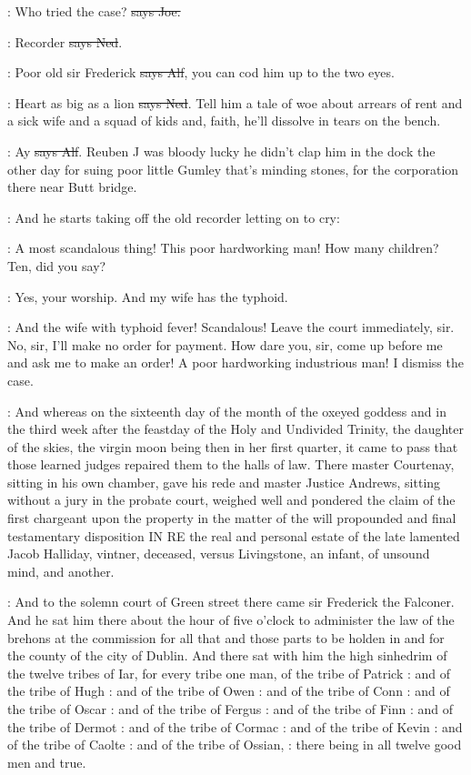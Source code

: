 \joe:
Who tried the case? \sout{says Joe.}

\lambert:
Recorder \sout{says Ned}.

\bergan:
Poor old sir Frederick \sout{says Alf},
you can cod him up to the two eyes.

\lambert:
Heart as big as a lion \sout{says Ned}.
Tell him a tale of woe about arrears
of rent and a sick wife and a squad of kids and, faith, he'll dissolve in
tears on the bench.

\bergan:
Ay \sout{says Alf}.
Reuben J was bloody lucky he didn't clap him in the dock
the other day for suing poor little Gumley that's minding stones, for the
corporation there near Butt bridge.

\Nq:
And he starts taking off the old recorder letting on to cry:

\bergan:
A most scandalous thing! This poor hardworking man! How many
children? Ten, did you say?

\bergan:
Yes, your worship. And my wife has the typhoid.

\bergan:
And the wife with typhoid fever! Scandalous! Leave the court
immediately, sir. No, sir, I'll make no order for payment. How dare you,
sir, come up before me and ask me to make an order! A poor hardworking
industrious man! I dismiss the case.

:
And whereas on the sixteenth day of the month of the oxeyed goddess and in
the third week after the feastday of the Holy and Undivided Trinity,
the daughter of the skies, the virgin moon being then in her first
quarter, it came to pass that those learned judges repaired them to the
halls of law. There master Courtenay, sitting in his own chamber,
gave his rede and master Justice Andrews, sitting without a jury
in the probate court, weighed well and pondered the claim of the
first chargeant upon the property in the matter of the will
propounded and final testamentary disposition IN RE the real and
personal estate of the late lamented Jacob Halliday, vintner, deceased,
versus Livingstone, an infant, of unsound mind, and another.

:
And to the
solemn court of Green street there came sir Frederick the Falconer. And he
sat him there about the hour of five o'clock to administer the law of the
brehons at the commission for all that and those parts to be holden in
and for the county of the city of Dublin. And there sat with him the high
sinhedrim of the twelve tribes of Iar, for every tribe one man,
of the tribe of Patrick
:
and of the tribe of Hugh
:
and of the tribe of Owen
:
and of the tribe of Conn
:
and of the tribe of Oscar
:
and of the tribe of Fergus
:
and of the tribe of Finn
:
and of the tribe of Dermot
:
and of the tribe of Cormac
:
and of the tribe of Kevin
:
and of the tribe of Caolte
:
and of the tribe of Ossian,
:
there being in all twelve good men and true.


